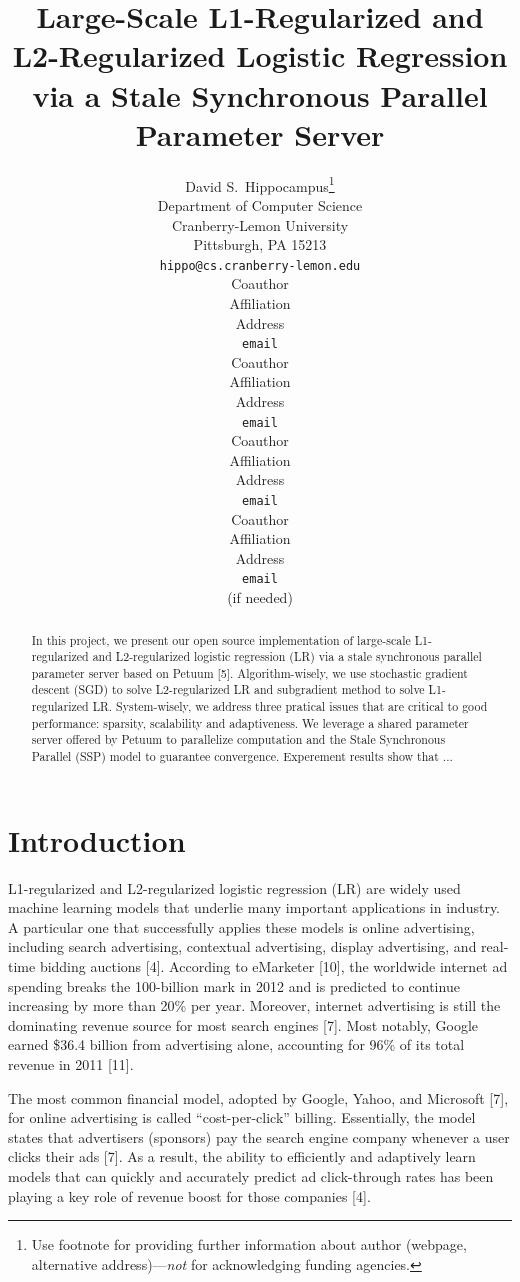 \documentclass{article} %
\title{Large-Scale L1-Regularized and L2-Regularized Logistic Regression via a Stale Synchronous Parallel Parameter Server}
\author{
David S.~Hippocampus\thanks{ Use footnote for providing further information
about author (webpage, alternative address)---\emph{not} for acknowledging
funding agencies.} \\
Department of Computer Science\\
Cranberry-Lemon University\\
Pittsburgh, PA 15213 \\
\texttt{hippo@cs.cranberry-lemon.edu} \\
\And
Coauthor \\
Affiliation \\
Address \\
\texttt{email} \\
\AND
Coauthor \\
Affiliation \\
Address \\
\texttt{email} \\
\And
Coauthor \\
Affiliation \\
Address \\
\texttt{email} \\
\And
Coauthor \\
Affiliation \\
Address \\
\texttt{email} \\
(if needed)\\
}
\begin{document}
\maketitle

\begin{abstract}

In this project, we present our open source implementation of large-scale L1-regularized and L2-regularized logistic regression (LR) via a stale synchronous parallel parameter server based on Petuum [5]. Algorithm-wisely, we use stochastic gradient descent (SGD) to solve L2-regularized LR and subgradient method to solve L1-regularized LR. System-wisely, we address three pratical issues that are critical to good performance: sparsity, scalability and adaptiveness. We leverage a shared parameter server offered by Petuum to parallelize computation and the Stale Synchronous Parallel (SSP) model to guarantee convergence. Experement results show that ...

\end{abstract}

\section{Introduction}

L1-regularized and L2-regularized logistic regression (LR) are widely used machine learning models that underlie many important applications in industry. A particular one that successfully applies these models is online advertising, including search advertising, contextual advertising, display advertising, and real-time bidding auctions [4]. According to eMarketer [10], the worldwide internet ad spending breaks the 100-billion mark in 2012 and is predicted to continue increasing by more than 20\% per year. Moreover, internet advertising is still the dominating revenue source for most search engines [7]. Most notably, Google earned \$36.4 billion from advertising alone, accounting for 96\% of its total revenue in 2011 [11].

The most common financial model, adopted by Google, Yahoo, and Microsoft [7], for online advertising is called “cost-per-click” billing. Essentially, the model states that advertisers (sponsors) pay the search engine company whenever a user clicks their ads [7]. As a result, the ability to efficiently and adaptively learn models that can quickly and accurately predict ad click-through rates has been playing a key role of revenue boost for those companies [4].
\end{document}
